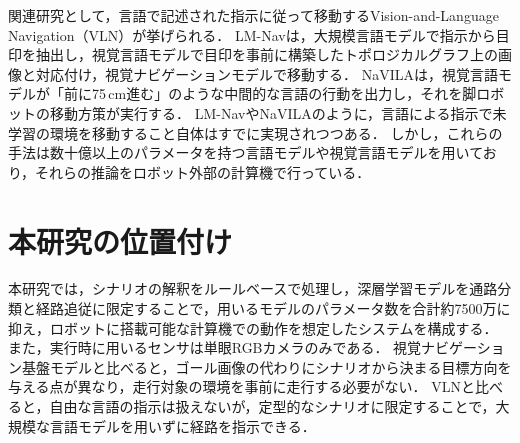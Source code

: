 関連研究として，言語で記述された指示に従って移動するVision-and-Language Navigation（VLN）が挙げられる．
LM-Navは，大規模言語モデルで指示から目印を抽出し，視覚言語モデルで目印を事前に構築したトポロジカルグラフ上の画像と対応付け，視覚ナビゲーションモデルで移動する\cite{lmnav}．
NaVILAは，視覚言語モデルが「前に75\,cm進む」のような中間的な言語の行動を出力し，それを脚ロボットの移動方策が実行する\cite{navila}．
LM-Nav\cite{lmnav}やNaVILA\cite{navila}のように，言語による指示で未学習の環境を移動すること自体はすでに実現されつつある．
しかし，これらの手法は数十億以上のパラメータを持つ言語モデルや視覚言語モデルを用いており，それらの推論をロボット外部の計算機で行っている\cite{lmnav,navila}．

\section{本研究の位置付け}
\label{sec:related_position}

本研究では，シナリオの解釈をルールベースで処理し，深層学習モデルを通路分類と経路追従に限定することで，用いるモデルのパラメータ数を合計約7500万に抑え，ロボットに搭載可能な計算機での動作を想定したシステムを構成する．
また，実行時に用いるセンサは単眼RGBカメラのみである．
視覚ナビゲーション基盤モデルと比べると，ゴール画像の代わりにシナリオから決まる目標方向を与える点が異なり，走行対象の環境を事前に走行する必要がない．
VLNと比べると，自由な言語の指示は扱えないが，定型的なシナリオに限定することで，大規模な言語モデルを用いずに経路を指示できる．
